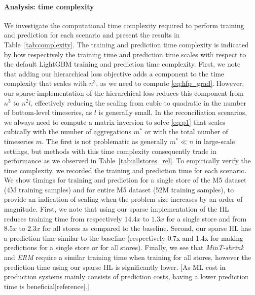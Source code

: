 \documentclass[preprint, 3p, times, twocolumn]{elsarticle}
\begin{document}
  \paragraph{Analysis: time complexity} We investigate the computational time complexity required to perform training and prediction for each scenario and present the results in Table~\ref{tab:complexity}. The training and prediction time complexity is indicated by how respectively the training time and prediction time scales with respect to the default LightGBM training and prediction time complexity. First, we note that adding our hierarchical loss objective adds a component to the time complexity that scales with \(n^3\), as we need to compute \eqref{eq:hfp_grad}. However, our sparse implementation of the hierarchical loss reduces this component from \(n^3\) to \(n^2l\), effectively reducing the scaling from cubic to quadratic in the number of bottom-level timeseries, as \(l\) is generally small. In the reconciliation scenarios, we always need to compute a matrix inversion to solve \eqref{eq:p1} that scales cubically with the number of aggregations \(m^*\) or with the total number of timeseries \(m\). The first is not problematic as generally \(m^* \ll n\) in large-scale settings, but methods with this time complexity consequently trade in performance as we observed in Table~\ref{tab:allstores_rel}. To empirically verify the time complexity, we recorded the training and prediction time for each scenario. We show timings for training and prediction for a single store of the M5 dataset (4M training samples) and for entire M5 dataset (52M training samples), to provide an indication of scaling when the problem size increases by an order of magnitude. First, we note that using our sparse implementation of the HL reduces training time from respectively \(14.4x\) to \(1.3x\) for a single store and from \(8.5x\) to \(2.3x\) for all stores as compared to the baseline. Second, our sparse HL has a prediction time similar to the baseline (respectively 0.7x and 1.4x for making predictions for a single store or for all stores). Finally, we see that \textit{MinT-shrink} and \textit{ERM} require a similar training time when training for all stores, however the prediction time using our sparse HL is significantly lower. [As ML cost in production systems mainly consists of prediction costs, having a lower prediction time is beneficial[reference].] 
\end{document}
